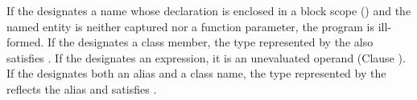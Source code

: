 \begin{std.txt}
\pnum
If the  designates a name whose declaration is enclosed in a block
scope ()
and the named entity is neither captured nor a function
parameter, the program is ill-formed.  If the 
designates a class member, the type represented by the
 also satisfies .
If the  designates an expression, it is an
unevaluated operand (Clause ).  If the
 designates both an alias and a class name, the
type represented by the  reflects the alias and
satisfies .

\end{std.txt}
